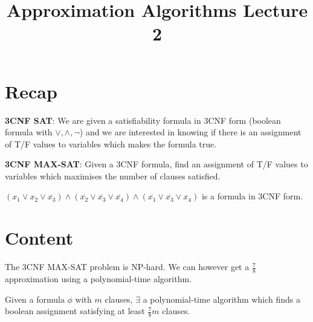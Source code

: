 \documentclass[a4paper]{article}
\title{\textbf{Approximation Algorithms Lecture 2}}
\date{}
\newcommand{\nl}{\vspace{0.2cm}\\}
\newcommand{\ol}{\overline}
\begin{document}
\maketitle
\tableofcontents

\section{Recap}

\begin{defn}
    \textbf{3CNF SAT}: We are given a satisfiability formula in 3CNF form (boolean formula with $\lor, \land, \lnot$) and we are interested in knowing if there is an assignment of T/F values to variables which makes the formula true.
\end{defn}

\begin{defn}
    \textbf{3CNF MAX-SAT}: Given a 3CNF formula, find an assignment of T/F values to variables which maximises the number of clauses satisfied.
\end{defn}

\begin{eg}
    $(x_1 \lor x_2 \lor \ol{x_3}) \land (\ol{x_2} \lor \ol{x_3} \lor \ol{x_4}) \land (\ol{x_1} \lor \ol{x_3} \lor x_4)$ is a formula in 3CNF form.
\end{eg}

\section{Content}

The 3CNF MAX-SAT problem is NP-hard. We can however get a $\frac{7}{8}$ approximation using a polynomial-time algorithm.\nl

\begin{theorem}
    Given a formula $\phi$ with $m$ clauses, $\exists$ a polynomial-time algorithm which finds a boolean assignment satisfying at least $\frac{7}{8}m$ clauses.
\end{theorem}
\end{document}
